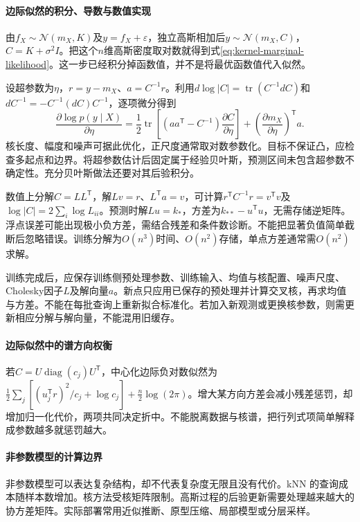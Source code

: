 \paragraph{边际似然的积分、导数与数值实现}
由$f_X\sim\mathcal N(m_X,K)$及$y=f_X+\varepsilon$，独立高斯相加后$y\sim\mathcal N(m_X,C)$，$C=K+\sigma^2I$。把这个$n$维高斯密度取对数就得到式\eqref{eq:kernel-marginal-likelihood}。这一步已经积分掉函数值，并不是将最优函数值代入似然。

设超参数为$\eta$，$r=y-m_X$、$a=C^{-1}r$。利用$d\log|C|=\operatorname{tr}(C^{-1}dC)$和$dC^{-1}=-C^{-1}(dC)C^{-1}$，逐项微分得到
\begin{equation}
 \frac{\partial\log p(y\mid X)}{\partial\eta}
 =\frac12\operatorname{tr}\left[(aa^{\mathsf T}-C^{-1})\frac{\partial C}{\partial\eta}\right]
  +\left(\frac{\partial m_X}{\partial\eta}\right)^{\mathsf T}a.
\end{equation}
核长度、幅度和噪声可据此优化，正尺度通常取对数参数化。目标不保证凸，应检查多起点和边界。将超参数估计后固定属于经验贝叶斯，预测区间未包含超参数不确定性。充分贝叶斯做法还要对其后验积分。

数值上分解$C=LL^{\mathsf T}$，解$Lv=r$、$L^{\mathsf T}a=v$，可计算$r^{\mathsf T}C^{-1}r=v^{\mathsf T}v$及$\log|C|=2\sum_i\log L_{ii}$。预测时解$Lu=k_*$，方差为$k_{**}-u^{\mathsf T}u$，无需存储逆矩阵。浮点误差可能出现极小负方差，需结合残差和条件数诊断。不能把显著负值简单截断后忽略错误。训练分解为$O(n^3)$时间、$O(n^2)$存储，单点方差通常需$O(n^2)$求解。

训练完成后，应保存训练侧预处理参数、训练输入、均值与核配置、噪声尺度、Cholesky因子$L$及解向量$a$。新点只应用已保存的预处理并计算交叉核，再求均值与方差。不能在每批查询上重新拟合标准化。若加入新观测或更换核参数，则需更新相应分解与解向量，不能混用旧缓存。

\paragraph{边际似然中的谱方向权衡}
若$C=U\operatorname{diag}(c_j)U^{\mathsf T}$，中心化边际负对数似然为$\frac12\sum_j[(u_j^{\mathsf T}r)^2/c_j+\log c_j]+\frac n2\log(2\pi)$。增大某方向方差会减小残差惩罚，却增加归一化代价，两项共同决定折中。不能脱离数据与核谱，把行列式项简单解释成参数越多就惩罚越大。

\paragraph{非参数模型的计算边界}
非参数模型可以表达复杂结构，却不代表复杂度无限且没有代价。kNN 的查询成本随样本数增加。核方法受核矩阵限制。高斯过程的后验更新需要处理越来越大的协方差矩阵。实际部署常用近似推断、原型压缩、局部模型或分层采样。

